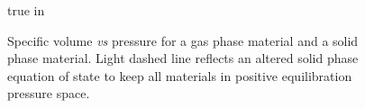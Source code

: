 \begin{figure}[t]
  true in
 \caption{Specific volume {\it vs} pressure for a gas phase material 
          and a solid phase material.  Light dashed line reflects an 
          altered solid phase equation of state to keep all materials
          in positive equilibration pressure space.}
 \label{vpfig}
\end{figure}
